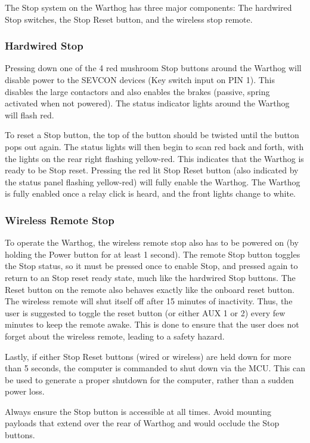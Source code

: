 \documentclass[]{clearpath-latex/clearpath-manual}
\begin{document}
The Stop system on the Warthog has three major components: The hardwired Stop switches, the Stop Reset button, and the wireless stop remote.

\subsubsection{Hardwired Stop}

Pressing down one of the 4 red mushroom Stop buttons around the Warthog will disable power to the SEVCON devices (Key switch input on PIN 1). This disables the large contactors and also enables the brakes (passive, spring activated when not powered). The status indicator lights around the Warthog will flash red.

To reset a Stop button, the top of the button should be twisted until the button pops out again. The status lights will then begin to scan red back and forth, with the lights on the rear right flashing yellow-red. This indicates that the Warthog is ready to be Stop reset. Pressing the red lit Stop Reset button (also indicated by the status panel flashing yellow-red) will fully enable the Warthog. The Warthog is fully enabled once a relay click is heard, and the front lights change to white.

\subsubsection{Wireless Remote Stop}

To operate the Warthog, the wireless remote stop also has to be powered on (by holding the Power button for at least 1 second). The remote Stop button toggles the Stop status, so it must be pressed once to enable Stop, and pressed again to return to an Stop reset ready state, much like the hardwired Stop buttons. The Reset button on the remote also behaves exactly like the onboard reset button. The wireless remote will shut itself off after 15 minutes of inactivity. Thus, the user is suggested to toggle the reset button (or either AUX 1 or 2) every few minutes to keep the remote awake. This is done to ensure that the user does not forget about the wireless remote, leading to a safety hazard.

Lastly, if either Stop Reset buttons (wired or wireless) are held down for more than 5 seconds, the computer is commanded to shut down via the MCU. This can be used to generate a proper shutdown for the computer, rather than a sudden power loss.

Always ensure the Stop button is accessible at all times. Avoid mounting payloads that extend over the rear of Warthog and would occlude the Stop buttons.
\end{document}
